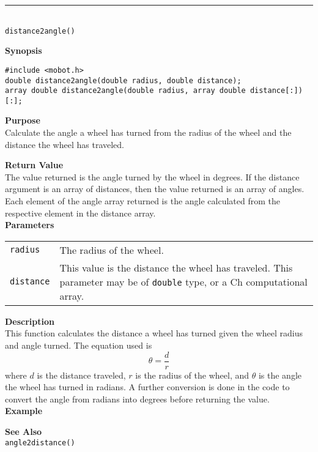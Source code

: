 \noindent
\vspace{5pt}
\rule{4.5in}{0.015in}\\
\noindent
{\LARGE \texttt{distance2angle()}}\\
{}

\noindent
{\bf Synopsis}
\vspace{-8pt}
\begin{verbatim}
#include <mobot.h>
double distance2angle(double radius, double distance);
array double distance2angle(double radius, array double distance[:])[:];
\end{verbatim}

\noindent
{\bf Purpose}\\
Calculate the angle a wheel has turned from the radius of the wheel and
the distance the wheel has traveled.

\noindent
{\bf Return Value}\\
The value returned is the angle turned by the wheel in degrees. If the distance argument is an
array of distances, then the value returned is an array of angles. Each element
of the angle array returned is the angle calculated from the respective
element in the distance array.\\

\noindent
{\bf Parameters}
\vspace{-0.1in}
\begin{description}
\item               
\begin{tabular}{p{10 mm}p{145 mm}}
\texttt{radius} & The radius of the wheel. \\
\texttt{distance} & This value is the distance the wheel has traveled. This parameter may be of \texttt{double} type, or a Ch computational array. \\
\end{tabular}
\end{description}

\noindent
{\bf Description}\\
This function calculates the distance a wheel has turned given the wheel 
radius and angle turned. The equation used is
\begin{equation*}
\theta = \frac{d}{r}
\end{equation*}
where $d$ is the distance traveled, $r$ is the radius of the wheel, and $\theta$ is
the angle the wheel has turned in radians. A further conversion is done in the code to
convert the angle from radians into degrees before returning the value.
\\

\noindent
{\bf Example}\\
\noindent

\noindent
{\bf See Also}\\
\texttt{angle2distance()}

